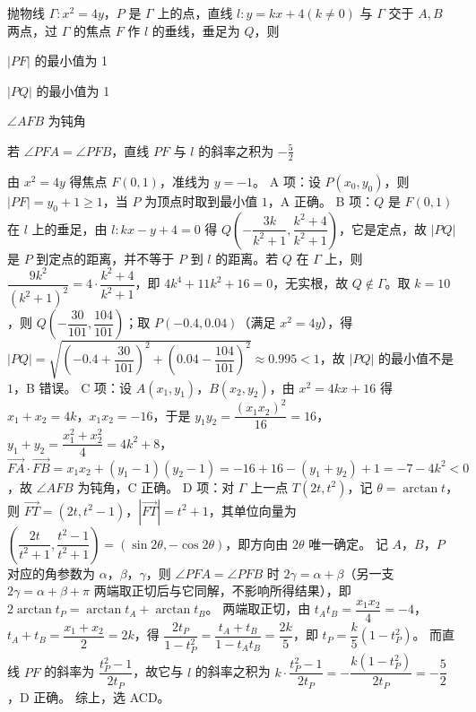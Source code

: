 \begin{question}
抛物线 $\Gamma: x^2 = 4y$，$P$ 是 $\Gamma$ 上的点，直线 $l: y = kx + 4 (k \neq 0)$ 与 $\Gamma$ 交于 $A,B$ 两点，过 $\Gamma$ 的焦点 $F$ 作 $l$ 的垂线，垂足为 $Q$，则\paren[ACD]
\begin{choices}
  \item $|PF|$ 的最小值为 1
  \item $|PQ|$ 的最小值为 1
  \item $\angle AFB$ 为钝角
  \item 若 $\angle PFA = \angle PFB$，直线 $PF$ 与 $l$ 的斜率之积为 $-\frac{5}{2}$
\end{choices}
\begin{solution}
由 $x^{2}=4y$ 得焦点 $F(0,1)$，准线为 $y=-1$。
A 项：设 $P(x_{0},y_{0})$，则 $|PF|=y_{0}+1\geqslant1$，当 $P$ 为顶点时取到最小值 $1$，A 正确。
B 项：$Q$ 是 $F(0,1)$ 在 $l$ 上的垂足，由 $l:kx-y+4=0$ 得 $Q\left(-\dfrac{3k}{k^{2}+1},\dfrac{k^{2}+4}{k^{2}+1}\right)$，它是定点，故 $|PQ|$ 是 $P$ 到定点的距离，并不等于 $P$ 到 $l$ 的距离。若 $Q$ 在 $\Gamma$ 上，则 $\dfrac{9k^{2}}{(k^{2}+1)^{2}}=4\cdot\dfrac{k^{2}+4}{k^{2}+1}$，即 $4k^{4}+11k^{2}+16=0$，无实根，故 $Q\notin\Gamma$。取 $k=10$，则 $Q\left(-\dfrac{30}{101},\dfrac{104}{101}\right)$；取 $P(-0.4,0.04)$（满足 $x^{2}=4y$），得 $|PQ|=\sqrt{\left(-0.4+\dfrac{30}{101}\right)^{2}+\left(0.04-\dfrac{104}{101}\right)^{2}}\approx0.995<1$，故 $|PQ|$ 的最小值不是 $1$，B 错误。
C 项：设 $A(x_{1},y_{1})$，$B(x_{2},y_{2})$，由 $x^{2}=4kx+16$ 得 $x_{1}+x_{2}=4k$，$x_{1}x_{2}=-16$，于是 $y_{1}y_{2}=\dfrac{(x_{1}x_{2})^{2}}{16}=16$，$y_{1}+y_{2}=\dfrac{x_{1}^{2}+x_{2}^{2}}{4}=4k^{2}+8$，
$\overrightarrow{FA}\cdot\overrightarrow{FB}=x_{1}x_{2}+(y_{1}-1)(y_{2}-1)=-16+16-(y_{1}+y_{2})+1=-7-4k^{2}<0$，故 $\angle AFB$ 为钝角，C 正确。
D 项：对 $\Gamma$ 上一点 $T(2t,t^{2})$，记 $\theta=\arctan t$，则 $\overrightarrow{FT}=(2t,t^{2}-1)$，$|\overrightarrow{FT}|=t^{2}+1$，其单位向量为 $\left(\dfrac{2t}{t^{2}+1},\dfrac{t^{2}-1}{t^{2}+1}\right)=(\sin 2\theta,-\cos 2\theta)$，即方向由 $2\theta$ 唯一确定。
记 $A$，$B$，$P$ 对应的角参数为 $\alpha$，$\beta$，$\gamma$，则 $\angle PFA=\angle PFB$ 时 $2\gamma=\alpha+\beta$（另一支 $2\gamma=\alpha+\beta+\pi$ 两端取正切后与它同解，不影响所得结果），即 $2\arctan t_{P}=\arctan t_{A}+\arctan t_{B}$。
两端取正切，由 $t_{A}t_{B}=\dfrac{x_{1}x_{2}}{4}=-4$，$t_{A}+t_{B}=\dfrac{x_{1}+x_{2}}{2}=2k$，得 $\dfrac{2t_{P}}{1-t_{P}^{2}}=\dfrac{t_{A}+t_{B}}{1-t_{A}t_{B}}=\dfrac{2k}{5}$，即 $t_{P}=\dfrac{k}{5}\left(1-t_{P}^{2}\right)$。
而直线 $PF$ 的斜率为 $\dfrac{t_{P}^{2}-1}{2t_{P}}$，故它与 $l$ 的斜率之积为 $k\cdot\dfrac{t_{P}^{2}-1}{2t_{P}}=-\dfrac{k\left(1-t_{P}^{2}\right)}{2t_{P}}=-\dfrac{5}{2}$，D 正确。
综上，选 ACD。
\end{solution}
\end{question}

